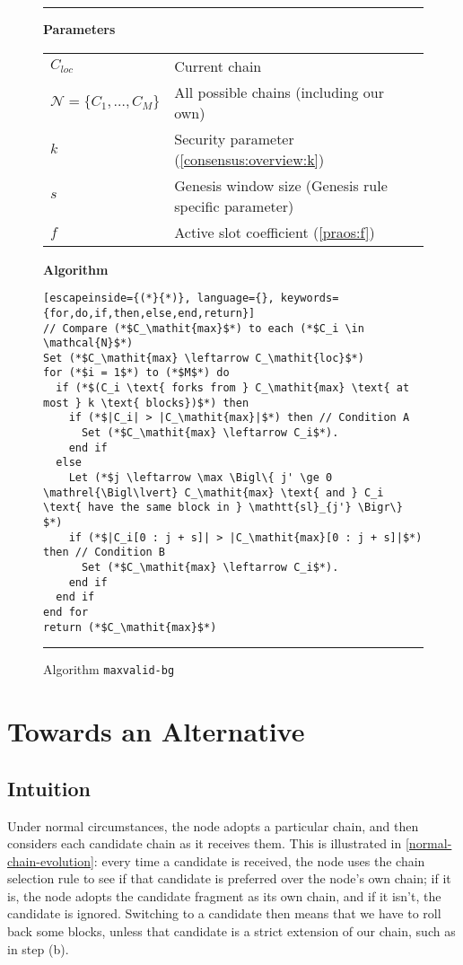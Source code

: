 \begin{figure}
\hrule

\textbf{Parameters} \\[0.5em]
\begin{tabular}{ll}
$C_\mathit{loc}$ & Current chain \\
$\mathcal{N} = \{C_1, \ldots, C_M\}$ & All possible chains (including our own) \\
$k$ & Security parameter (\cref{consensus:overview:k}) \\
$s$ & Genesis window size (Genesis rule specific parameter) \\
$f$ & Active slot coefficient (\cref{praos:f}) \\[1em]
\end{tabular}

\textbf{Algorithm}

\begin{lstlisting}[escapeinside={(*}{*)}, language={}, keywords={for,do,if,then,else,end,return}]
// Compare (*$C_\mathit{max}$*) to each (*$C_i \in \mathcal{N}$*)
Set (*$C_\mathit{max} \leftarrow C_\mathit{loc}$*)
for (*$i = 1$*) to (*$M$*) do
  if (*$(C_i \text{ forks from } C_\mathit{max} \text{ at most } k \text{ blocks})$*) then
    if (*$|C_i| > |C_\mathit{max}|$*) then // Condition A
      Set (*$C_\mathit{max} \leftarrow C_i$*).
    end if
  else
    Let (*$j \leftarrow \max \Bigl\{ j' \ge 0 \mathrel{\Bigl\lvert} C_\mathit{max} \text{ and } C_i \text{ have the same block in } \mathtt{sl}_{j'} \Bigr\} $*)
    if (*$|C_i[0 : j + s]| > |C_\mathit{max}[0 : j + s]|$*) then // Condition B
      Set (*$C_\mathit{max} \leftarrow C_i$*).
    end if
  end if
end for
return (*$C_\mathit{max}$*)
\end{lstlisting}

\hrule
\caption{\label{genesis:maxvalid-bg}Algorithm \texttt{maxvalid-bg}}
\end{figure}

\section{Towards an Alternative}

\subsection{Intuition}

Under normal circumstances, the node adopts a particular chain, and then
considers each candidate chain as it receives them. This is illustrated in
\cref{normal-chain-evolution}: every time a candidate is received, the node uses
the chain selection rule to see if that candidate is preferred over the node's
own chain; if it is, the node adopts the candidate fragment as its own chain,
and if it isn't, the candidate is ignored. Switching to a candidate then means
that we have to roll back some blocks, unless that candidate is a strict
extension of our chain, such as in step (b).

